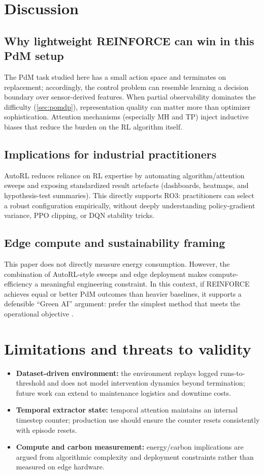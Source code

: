 \documentclass[11pt]{article}
\begin{document}
\section{Discussion}
\label{sec:discussion}
\subsection{Why lightweight REINFORCE can win in this PdM setup}
The PdM task studied here has a small action space and terminates on replacement; accordingly, the control problem can resemble learning a decision boundary over sensor-derived features. When partial observability dominates the difficulty (\cref{sec:pomdp}), representation quality can matter more than optimizer sophistication. Attention mechanisms (especially MH and TP) inject inductive biases that reduce the burden on the RL algorithm itself.

\subsection{Implications for industrial practitioners}
AutoRL reduces reliance on RL expertise by automating algorithm/attention sweeps and exposing standardized result artefacts (dashboards, heatmaps, and hypothesis-test summaries). This directly supports RO3: practitioners can select a robust configuration empirically, without deeply understanding policy-gradient variance, PPO clipping, or DQN stability tricks.

\subsection{Edge compute and sustainability framing}
This paper does not directly measure energy consumption. However, the combination of AutoRL-style sweeps and edge deployment makes compute-efficiency a meaningful engineering constraint. In this context, if REINFORCE achieves equal or better PdM outcomes than heavier baselines, it supports a defensible ``Green AI'' argument: prefer the simplest method that meets the operational objective \parencite{Schwartz2020GreenAI, Strubell2019Energy}.

\section{Limitations and threats to validity}
\label{sec:limits}
\begin{itemize}
	\item \textbf{Dataset-driven environment:} the environment replays logged runs-to-threshold and does not model intervention dynamics beyond termination; future work can extend to maintenance logistics and downtime costs.
	\item \textbf{Temporal extractor state:} temporal attention maintains an internal timestep counter; production use should ensure the counter resets consistently with episode resets.
	\item \textbf{Compute and carbon measurement:} energy/carbon implications are argued from algorithmic complexity and deployment constraints rather than measured on edge hardware.
\end{itemize}
\end{document}
